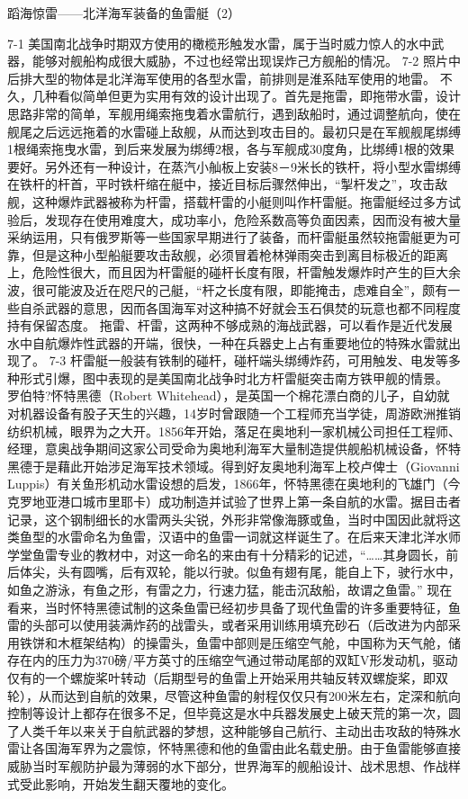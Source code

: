 \documentclass[12pt,UTF8]{ctexbook}
\begin{document}
蹈海惊雷——北洋海军装备的鱼雷艇（2）

7-1
美国南北战争时期双方使用的橄榄形触发水雷，属于当时威力惊人的水中武器，能够对舰船构成很大威胁，不过也经常出现误炸己方舰船的情况。
7-2
照片中后排大型的物体是北洋海军使用的各型水雷，前排则是淮系陆军使用的地雷。
不久，几种看似简单但更为实用有效的设计出现了。首先是拖雷，即拖带水雷，设计思路非常的简单，军舰用绳索拖曳着水雷航行，遇到敌船时，通过调整航向，使在舰尾之后远远拖着的水雷碰上敌舰，从而达到攻击目的。最初只是在军舰舰尾绑缚1根绳索拖曳水雷，到后来发展为绑缚2根，各与军舰成30度角，比绑缚1根的效果要好。另外还有一种设计，在蒸汽小舢板上安装8－9米长的铁杆，将小型水雷绑缚在铁杆的杆首，平时铁杆缩在艇中，接近目标后骤然伸出，“掣杆发之”，攻击敌舰，这种爆炸武器被称为杆雷，搭载杆雷的小艇则叫作杆雷艇。拖雷艇经过多方试验后，发现存在使用难度大，成功率小，危险系数高等负面因素，因而没有被大量采纳运用，只有俄罗斯等一些国家早期进行了装备，而杆雷艇虽然较拖雷艇更为可靠，但是这种小型船艇要攻击敌舰，必须冒着枪林弹雨突击到离目标极近的距离上，危险性很大，而且因为杆雷艇的碰杆长度有限，杆雷触发爆炸时产生的巨大余波，很可能波及近在咫尺的己艇，“杆之长度有限，即能掩击，虑难自全”，颇有一些自杀武器的意思，因而各国海军对这种搞不好就会玉石俱焚的玩意也都不同程度持有保留态度。 拖雷、杆雷，这两种不够成熟的海战武器，可以看作是近代发展水中自航爆炸性武器的开端，很快，一种在兵器史上占有重要地位的特殊水雷就出现了。
7-3
杆雷艇一般装有铁制的碰杆，碰杆端头绑缚炸药，可用触发、电发等多种形式引爆，图中表现的是美国南北战争时北方杆雷艇突击南方铁甲舰的情景。
罗伯特?怀特黑德（Robert Whitehead），是英国一个棉花漂白商的儿子，自幼就对机器设备有股子天生的兴趣，14岁时曾跟随一个工程师充当学徒，周游欧洲推销纺织机械，眼界为之大开。1856年开始，落足在奥地利一家机械公司担任工程师、经理，意奥战争期间这家公司受命为奥地利海军大量制造提供舰船机械设备，怀特黑德于是藉此开始涉足海军技术领域。得到好友奥地利海军上校卢俾士（Giovanni Luppis）有关鱼形机动水雷设想的启发，1866年，怀特黑德在奥地利的飞雄门（今克罗地亚港口城市里耶卡）成功制造并试验了世界上第一条自航的水雷。据目击者记录，这个钢制细长的水雷两头尖锐，外形非常像海豚或鱼，当时中国因此就将这类鱼型的水雷命名为鱼雷，汉语中的鱼雷一词就这样诞生了。在后来天津北洋水师学堂鱼雷专业的教材中，对这一命名的来由有十分精彩的记述，“……其身圆长，前后体尖，头有圆嘴，后有双轮，能以行驶。似鱼有翅有尾，能自上下，驶行水中，如鱼之游泳，有鱼之形，有雷之力，行速力猛，能击沉敌船，故谓之鱼雷。” 现在看来，当时怀特黑德试制的这条鱼雷已经初步具备了现代鱼雷的许多重要特征，鱼雷的头部可以使用装满炸药的战雷头，或者采用训练用填充砂石（后改进为内部采用铁饼和木框架结构）的操雷头，鱼雷中部则是压缩空气舱，中国称为天气舱，储存在内的压力为370磅/平方英寸的压缩空气通过带动尾部的双缸V形发动机，驱动仅有的一个螺旋桨叶转动（后期型号的鱼雷上开始采用共轴反转双螺旋桨，即双轮），从而达到自航的效果，尽管这种鱼雷的射程仅仅只有200米左右，定深和航向控制等设计上都存在很多不足，但毕竟这是水中兵器发展史上破天荒的第一次，圆了人类千年以来关于自航武器的梦想，这种能够自己航行、主动出击攻敌的特殊水雷让各国海军界为之震惊，怀特黑德和他的鱼雷由此名载史册。由于鱼雷能够直接威胁当时军舰防护最为薄弱的水下部分，世界海军的舰船设计、战术思想、作战样式受此影响，开始发生翻天覆地的变化。
\end{document}
